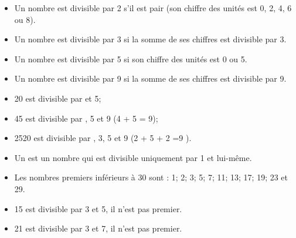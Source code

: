 \documentclass[xcolor={dvipsnames}]{beamer}
\begin{document}
\begin{frame}
	\begin{myprops}
		\begin{itemize}
			\item Un nombre est divisible par 2 \pause s'il est pair (son chiffre des unités est 0, 2, 4, 6 ou 8).\pause
			\item Un nombre est divisible par 3 \pause si la somme de ses chiffres est divisible par 3.\pause
			\item Un nombre est divisible par 5  \pause si son chiffre des unités est 0 ou 5.
			\item Un nombre est divisible par 9 \pause si la somme de ses chiffres est divisible par 9. \pause
		\end{itemize}
	\end{myprops}
	
	\begin{myexs}
		\begin{itemize}
			\item 20 est divisible par  et 5; \pause
			\item 45 est divisible par , 5 et 9 (4 + 5 = 9);\pause
			\item 2520 est divisible par , 3, 5 et 9 (2 + 5 + 2 =9 ).
		\end{itemize}
	\end{myexs}
\end{frame}

\begin{frame}
	\begin{myprops}
		\begin{itemize}
			\item Un  est un nombre qui est divisible uniquement par 1 et lui-même.	\pause
			
			\item Les nombres premiers inférieurs à 30 sont \pause: 1; 2; 3; 5; 7; 11; 13; 17; 19; 23 et 29. \pause
		\end{itemize}
		
	\end{myprops}
	
	\begin{myexs}
		\begin{itemize}
			\item 15 est divisible par 3 et 5, il n'est pas premier. \pause
			\item 21 est divisible par 3 et 7, il n'est pas premier.
		\end{itemize}
	\end{myexs}
\end{frame}
\end{document}
